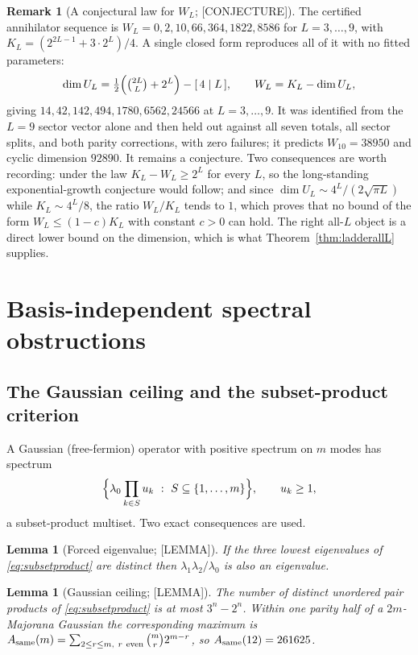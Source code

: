 \documentclass[11pt]{article}
\newtheorem{lemma}[theorem]{Lemma}
\theoremstyle{definition}
\newtheorem{remark}[theorem]{Remark}
\begin{document}
\begin{remark}[A conjectural law for $W_L$; {[CONJECTURE]}]
The certified annihilator sequence is $W_L=0,2,10,66,364,1822,8586$ for $L=3,\dots,9$, with
$K_L=(2^{2L-1}+3\cdot2^{L})/4$. A single closed form reproduces all of it with no fitted parameters:
\[
\dim U_L=\tfrac12\Bigl(\tbinom{2L}{L}+2^{L}\Bigr)-[\,4\mid L\,],\qquad W_L=K_L-\dim U_L ,
\]
giving $14,42,142,494,1780,6562,24566$ at $L=3,\dots,9$. It was identified from the $L=9$ sector
vector alone and then held out against all seven totals, all sector splits, and both parity
corrections, with zero failures; it predicts $W_{10}=38950$ and cyclic dimension $92890$. It remains
a conjecture. Two consequences are worth recording: under the law $K_L-W_L\ge2^{L}$ for every $L$, so
the long-standing exponential-growth conjecture would follow; and since
$\dim U_L\sim4^{L}/(2\sqrt{\pi L})$ while $K_L\sim4^{L}/8$, the ratio $W_L/K_L$ tends to $1$, which
proves that no bound of the form $W_L\le(1-c)K_L$ with constant $c>0$ can hold. The right all-$L$
object is a direct lower bound on the dimension, which is what Theorem~\ref{thm:ladderallL} supplies.
\end{remark}



\section{Basis-independent spectral obstructions}\label{sec:spectral}

\subsection{The Gaussian ceiling and the subset-product criterion}
A Gaussian (free-fermion) operator with positive spectrum on $m$ modes has spectrum
\begin{equation}
\Bigl\{\lambda_0\prod_{k\in S}u_k\ :\ S\subseteq\{1,\dots,m\}\Bigr\},\qquad u_k\ge1,
\label{eq:subsetproduct}
\end{equation}
a subset-product multiset. Two exact consequences are used.

\begin{lemma}[Forced eigenvalue; {[LEMMA]}]\label{lem:forced}
If the three lowest eigenvalues of \eqref{eq:subsetproduct} are distinct then
$\lambda_1\lambda_2/\lambda_0$ is also an eigenvalue.
\end{lemma}

\begin{lemma}[Gaussian ceiling; {[LEMMA]}]\label{lem:ceiling}
The number of distinct unordered pair products of \eqref{eq:subsetproduct} is at most $3^n-2^n$.
Within one parity half of a $2m$-Majorana Gaussian the corresponding maximum is
$A_{\rm same}(m)=\sum_{2\le r\le m,\ r\ \mathrm{even}}\binom{m}{r}2^{m-r}$, so
$A_{\rm same}(12)=261625$.
\end{lemma}
\end{document}
